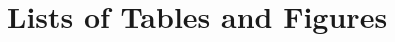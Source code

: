 \documentclass{fast_latex}
\begin{document}

\clearpage
{}
\appendix



\clearpage
\doublespacing
\appendix
\section{Lists of Tables and Figures}

\listoftables
\listoffigures

\clearpage


\end{document}
